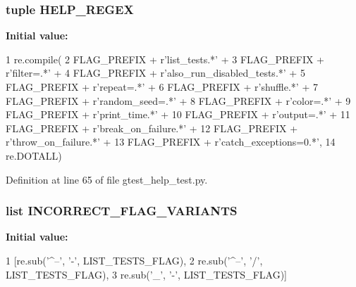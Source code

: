 \hypertarget{namespacegtest__help__test_a34b09d4c21c0dcb7e9b3d33ccea634a7}{
\subsubsection[{\-H\-E\-L\-P\-\_\-\-R\-E\-G\-E\-X}]{\setlength{\rightskip}{0pt plus 5cm}tuple {\bf \-H\-E\-L\-P\-\_\-\-R\-E\-G\-E\-X}}}\label{de/dbf/namespacegtest__help__test_a34b09d4c21c0dcb7e9b3d33ccea634a7}
{\bfseries \-Initial value\-:}
\begin{DoxyCode}
1 re.compile(
2     FLAG_PREFIX + r'list_tests.*' +
3     FLAG_PREFIX + r'filter=.*' +
4     FLAG_PREFIX + r'also_run_disabled_tests.*' +
5     FLAG_PREFIX + r'repeat=.*' +
6     FLAG_PREFIX + r'shuffle.*' +
7     FLAG_PREFIX + r'random_seed=.*' +
8     FLAG_PREFIX + r'color=.*' +
9     FLAG_PREFIX + r'print_time.*' +
10     FLAG_PREFIX + r'output=.*' +
11     FLAG_PREFIX + r'break_on_failure.*' +
12     FLAG_PREFIX + r'throw_on_failure.*' +
13     FLAG_PREFIX + r'catch_exceptions=0.*',
14     re.DOTALL)
\end{DoxyCode}


\-Definition at line 65 of file gtest\-\_\-help\-\_\-test.\-py.

\hypertarget{namespacegtest__help__test_a41c5874bbe0abdd9a254384c06b8b505}{
\subsubsection[{\-I\-N\-C\-O\-R\-R\-E\-C\-T\-\_\-\-F\-L\-A\-G\-\_\-\-V\-A\-R\-I\-A\-N\-T\-S}]{\setlength{\rightskip}{0pt plus 5cm}list {\bf \-I\-N\-C\-O\-R\-R\-E\-C\-T\-\_\-\-F\-L\-A\-G\-\_\-\-V\-A\-R\-I\-A\-N\-T\-S}}}\label{de/dbf/namespacegtest__help__test_a41c5874bbe0abdd9a254384c06b8b505}
{\bfseries \-Initial value\-:}
\begin{DoxyCode}
1 [re.sub('^--', '-', LIST_TESTS_FLAG),
2                            re.sub('^--', '/', LIST_TESTS_FLAG),
3                            re.sub('_', '-', LIST_TESTS_FLAG)]
\end{DoxyCode}


